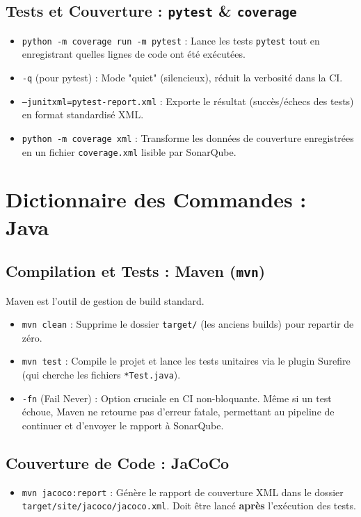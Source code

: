 \documentclass[11pt, a4paper]{report}
\begin{document}
\subsection{Tests et Couverture : \texttt{pytest} \& \texttt{coverage}}
\begin{itemize}[leftmargin=1.5cm]
    \item \texttt{python -m coverage run -m pytest} : Lance les tests \texttt{pytest} tout en enregistrant quelles lignes de code ont été exécutées.
    \item \texttt{-q} (pour pytest) : Mode "quiet" (silencieux), réduit la verbosité dans la CI.
    \item \texttt{--junitxml=pytest-report.xml} : Exporte le résultat (succès/échecs des tests) en format standardisé XML.
    \item \texttt{python -m coverage xml} : Transforme les données de couverture enregistrées en un fichier \texttt{coverage.xml} lisible par SonarQube.
\end{itemize}

\newpage

\section{Dictionnaire des Commandes : Java}

\subsection{Compilation et Tests : Maven (\texttt{mvn})}
Maven est l'outil de gestion de build standard.
\begin{itemize}[leftmargin=1.5cm]
    \item \texttt{mvn clean} : Supprime le dossier \texttt{target/} (les anciens builds) pour repartir de zéro.
    \item \texttt{mvn test} : Compile le projet et lance les tests unitaires via le plugin Surefire (qui cherche les fichiers \texttt{*Test.java}).
    \item \texttt{-fn} (Fail Never) : Option cruciale en CI non-bloquante. Même si un test échoue, Maven ne retourne pas d'erreur fatale, permettant au pipeline de continuer et d'envoyer le rapport à SonarQube.
\end{itemize}

\subsection{Couverture de Code : JaCoCo}
\begin{itemize}[leftmargin=1.5cm]
    \item \texttt{mvn jacoco:report} : Génère le rapport de couverture XML dans le dossier \texttt{target/site/jacoco/jacoco.xml}. Doit être lancé \textbf{après} l'exécution des tests.
\end{itemize}
\end{document}
